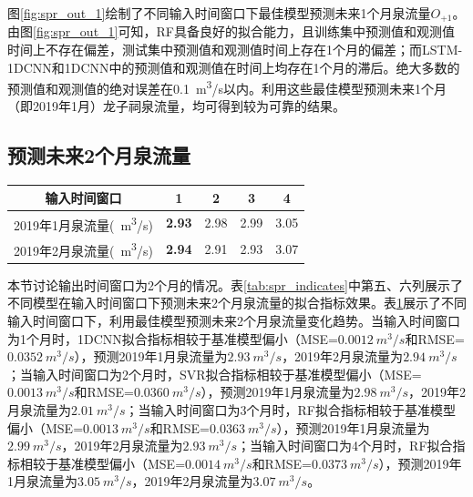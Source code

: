 图\ref{fig:spr_out_1}绘制了不同输入时间窗口下最佳模型预测未来1个月泉流量$O_{+1}$。由图\ref{fig:spr_out_1}可知，RF具备良好的拟合能力，且训练集中预测值和观测值时间上不存在偏差，测试集中预测值和观测值时间上存在1个月的偏差；而LSTM-1DCNN和1DCNN中的预测值和观测值在时间上均存在1个月的滞后。绝大多数的预测值和观测值的绝对误差在\SI{0.1}{m^{3}/s}以内。利用这些最佳模型预测未来1个月（即2019年1月）龙子祠泉流量，均可得到较为可靠的结果。

\subsection{预测未来2个月泉流量}\label{sec:spr_two}

\begin{table}[!htbp]
  \centering
  \label{tab:spr_two}
  \footnotesize
  \begin{tabular}{ccccc}
    \toprule
    输入时间窗口 & 1 & 2 & 3 & 4\\
    \midrule
    2019年1月泉流量(\SI{}{m^{3}/s})& \textbf{2.93} & 2.98 & 2.99 & 3.05 \\
    2019年2月泉流量(\SI{}{m^{3}/s})& \textbf{2.94} & 2.91 & 2.93 & 3.07 \\
    \bottomrule
  \end{tabular}
\end{table}

本节讨论输出时间窗口为2个月的情况。表\ref{tab:spr_indicates}中第五、六列展示了不同模型在输入时间窗口下预测未来2个月泉流量的拟合指标效果。表\ref{tab:spr_two}展示了不同输入时间窗口下，利用最佳模型预测未来2个月泉流量变化趋势。当输入时间窗口为1个月时，1DCNN拟合指标相较于基准模型偏小（MSE=$\SI{0.0012}{m^{3}/s}$和RMSE=$\SI{0.0352}{m^{3}/s}$），预测2019年1月泉流量为$\SI{2.93}{m^{3}/s}$，2019年2月泉流量为$\SI{2.94}{m^{3}/s}$；当输入时间窗口为2个月时，SVR拟合指标相较于基准模型偏小（MSE=$\SI{0.0013}{m^{3}/s}$和RMSE=$\SI{0.0360}{m^{3}/s}$），预测2019年1月泉流量为$\SI{2.98}{m^{3}/s}$，2019年2月泉流量为$\SI{2.01}{m^{3}/s}$；当输入时间窗口为3个月时，RF拟合指标相较于基准模型偏小（MSE=$\SI{0.0013}{m^{3}/s}$和RMSE=$\SI{0.0363}{m^{3}/s}$），预测2019年1月泉流量为$\SI{2.99}{m^{3}/s}$，2019年2月泉流量为$\SI{2.93}{m^{3}/s}$；当输入时间窗口为4个月时，RF拟合指标相较于基准模型偏小（MSE=$\SI{0.0014}{m^{3}/s}$和RMSE=$\SI{0.0373}{m^{3}/s}$），预测2019年1月泉流量为$\SI{3.05}{m^{3}/s}$，2019年2月泉流量为$\SI{3.07}{m^{3}/s}$。


